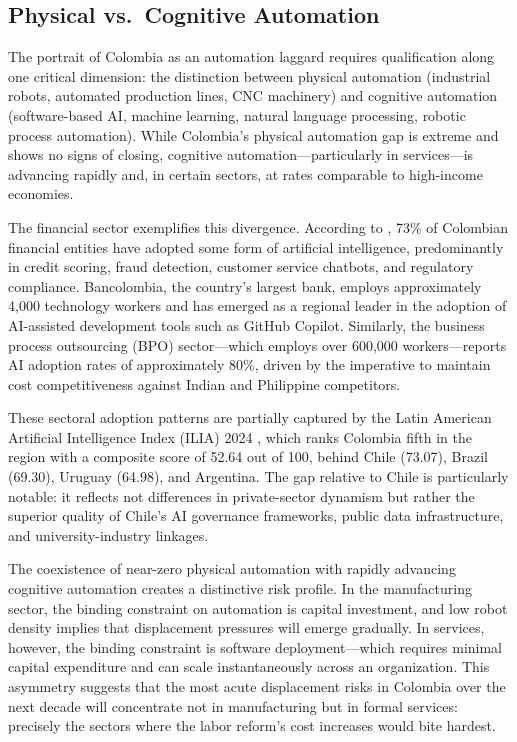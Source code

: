 \documentclass{article}
\begin{document}
\subsection{Physical vs.\ Cognitive Automation}
\label{subsec:physical_cognitive}

The portrait of Colombia as an automation laggard requires qualification along one critical dimension: the distinction between physical automation (industrial robots, automated production lines, CNC machinery) and cognitive automation (software-based AI, machine learning, natural language processing, robotic process automation). While Colombia's physical automation gap is extreme and shows no signs of closing, cognitive automation---particularly in services---is advancing rapidly and, in certain sectors, at rates comparable to high-income economies.

The financial sector exemplifies this divergence. According to \cite{asobancaria2024}, 73\% of Colombian financial entities have adopted some form of artificial intelligence, predominantly in credit scoring, fraud detection, customer service chatbots, and regulatory compliance. Bancolombia, the country's largest bank, employs approximately 4,000 technology workers and has emerged as a regional leader in the adoption of AI-assisted development tools such as GitHub Copilot. Similarly, the business process outsourcing (BPO) sector---which employs over 600,000 workers---reports AI adoption rates of approximately 80\%, driven by the imperative to maintain cost competitiveness against Indian and Philippine competitors.

These sectoral adoption patterns are partially captured by the Latin American Artificial Intelligence Index (ILIA) 2024 \cite{ilia2024}, which ranks Colombia fifth in the region with a composite score of 52.64 out of 100, behind Chile (73.07), Brazil (69.30), Uruguay (64.98), and Argentina. The gap relative to Chile is particularly notable: it reflects not differences in private-sector dynamism but rather the superior quality of Chile's AI governance frameworks, public data infrastructure, and university-industry linkages.

The coexistence of near-zero physical automation with rapidly advancing cognitive automation creates a distinctive risk profile. In the manufacturing sector, the binding constraint on automation is capital investment, and low robot density implies that displacement pressures will emerge gradually. In services, however, the binding constraint is software deployment---which requires minimal capital expenditure and can scale instantaneously across an organization. This asymmetry suggests that the most acute displacement risks in Colombia over the next decade will concentrate not in manufacturing but in formal services: precisely the sectors where the labor reform's cost increases would bite hardest.
\end{document}
